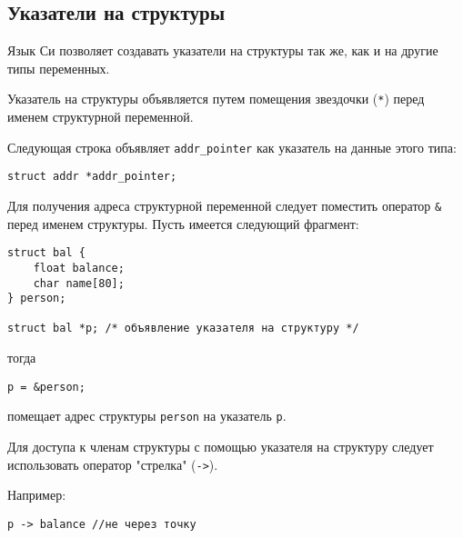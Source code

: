 \subsection{Указатели на структуры}

Язык Си позволяет создавать указатели на структуры так же, как и на другие типы переменных. 

Указатель на структуры объявляется путем помещения звездочки (\texttt{*}) перед именем структурной переменной.

Следующая строка объявляет \texttt{addr\_pointer} как указатель на данные этого типа:

\begin{verbatim}
struct addr *addr_pointer; 
\end{verbatim}

Для получения адреса структурной переменной следует поместить оператор \texttt{\&} перед именем структуры. Пусть имеется следующий фрагмент:

\begin{verbatim}
struct bal { 
    float balance;
    char name[80];
} person; 

struct bal *p; /* объявление указателя на структуру */ 
\end{verbatim}

тогда

\begin{verbatim}
p = &person;
\end{verbatim}

помещает адрес структуры \texttt{person} на указатель \texttt{p}.

Для доступа к членам структуры с помощью указателя на структуру следует использовать оператор "стрелка" (\texttt{->}). 

Например:

\begin{verbatim}
p -> balance //не через точку
\end{verbatim}